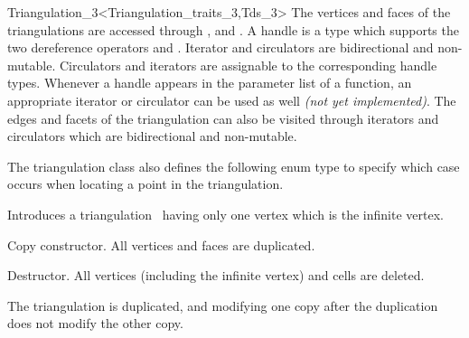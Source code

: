 \begin{ccRefClass}{Triangulation_3<Triangulation_traits_3,Tds_3>}
The vertices and faces of the triangulations are accessed through
,  and . 
A handle is a type which supports the two dereference operators
 and . Iterator and circulators are
bidirectional and non-mutable.  Circulators and iterators are
assignable to the corresponding handle types. Whenever a handle appears 
in the parameter list of a function, an appropriate iterator or
circulator can be used as well \textit{(not yet implemented)}.  The
edges and facets of the 
triangulation can also be visited through iterators and circulators
which are bidirectional and non-mutable.

\ccGlue
{}

\ccGlue
{}
\ccGlue
{}
\ccGlue
{}

\ccGlue
{}

The triangulation class also defines the following enum type to specify
which case occurs when locating a point in the triangulation. 

{}


\ccCreation
{}  %


{Introduces a triangulation \ccVar\ having only one vertex which is the
infinite vertex.} 

{Copy constructor. All vertices and faces are duplicated.}

{Destructor. All vertices (including the infinite vertex) and cells are
deleted.}

\ccOperations


{The triangulation  is duplicated, and modifying one copy after the 
duplication does not modify the other copy.}


\end{ccRefClass}
